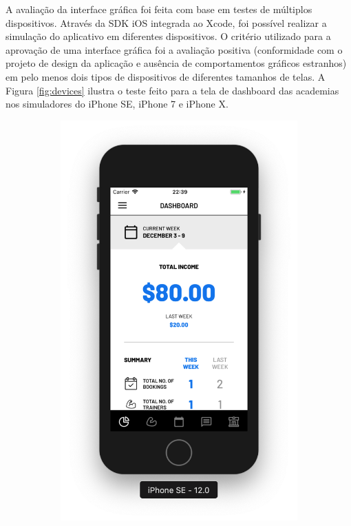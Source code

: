 A avaliação da interface gráfica foi feita com base em testes de múltiplos dispositivos. Através da SDK iOS integrada ao Xcode, foi possível realizar a simulação do aplicativo em diferentes dispositivos. O critério utilizado para a aprovação de uma interface gráfica foi a avaliação positiva (conformidade com o projeto de design da aplicação e ausência de comportamentos gráficos estranhos) em pelo menos dois tipos de dispositivos de diferentes tamanhos de telas. A Figura \ref{fig:devices} ilustra o teste feito para a tela de dashboard das academias nos simuladores do iPhone SE, iPhone 7 e iPhone X.

\begin{figure}[H]
	\centering
    \begin{subfigure}[b]{0.3\textwidth}
        \includegraphics[width=\textwidth]{pfc/figuras/se.png}

\end{subfigure}
\end{figure}

